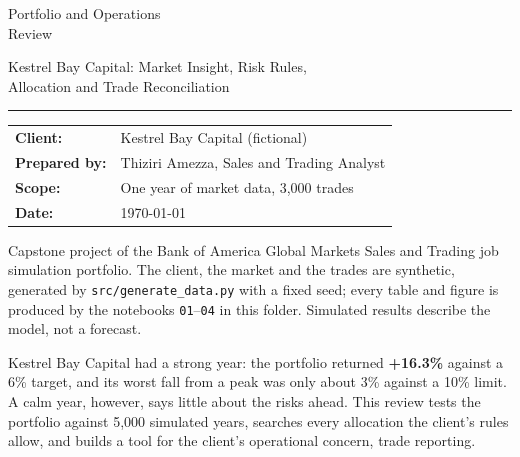 \documentclass[11pt]{article}
\let\oldheading\heading
\renewcommand{\heading}[1]{\Needspace{8\baselineskip}\oldheading{#1}}
\begin{document}
\begin{titlepage}
  \vspace*{4cm}
  {\color{navy}\fontsize{30}{36}\selectfont Portfolio and Operations\\[2mm]
  Review}\par\medskip
  {\Large Kestrel Bay Capital: Market Insight, Risk Rules,\\
  Allocation and Trade Reconciliation}\par
  {\color{rulegray}\rule{\linewidth}{0.6pt}}\par\bigskip
  \begin{tabular}{@{}ll}
    \textbf{Client:}      & Kestrel Bay Capital (fictional) \\
    \textbf{Prepared by:} & Thiziri Amezza, Sales and Trading Analyst \\
    \textbf{Scope:}       & One year of market data, 3,000 trades \\
    \textbf{Date:}        & \today \\
  \end{tabular}
  \vfill
  {\small\color{gray}Capstone project of the Bank of America Global Markets
  Sales and Trading job simulation portfolio. The client, the market and the
  trades are synthetic, generated by \texttt{src/generate\_data.py} with a
  fixed seed; every table and figure is produced by the notebooks
  \texttt{01}--\texttt{04} in this folder. Simulated results describe the
  model, not a forecast.}
\end{titlepage}

Kestrel Bay Capital had a strong year: the portfolio returned
\textbf{+16.3\%} against a 6\% target, and its worst fall from a peak was
only about 3\% against a 10\% limit. A calm year, however, says little about
the risks ahead. This review tests the portfolio against 5,000 simulated
years, searches every allocation the client's rules allow, and builds a tool
for the client's operational concern, trade reporting.
\end{document}
